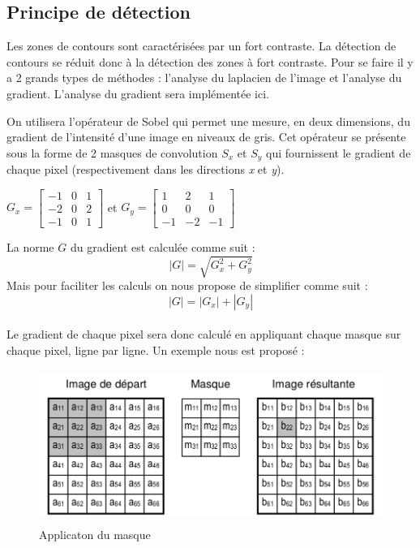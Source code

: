 \subsection{Principe de détection}
Les zones de contours sont caractérisées par un fort contraste. La détection de contours se réduit donc à la détection des zones à fort contraste. Pour se faire il y a 2 grands types de méthodes : l'analyse du laplacien de l'image et l'analyse du gradient. L'analyse du gradient sera implémentée ici.

\medskip

On utilisera l'opérateur de Sobel qui permet une mesure, en deux dimensions, du gradient de l'intensité d'une image en niveaux de gris. Cet opérateur se présente sous la forme de 2 masques de convolution $S_x$ et $S_y$ qui fournissent le gradient de chaque pixel (respectivement dans les directions \textit{x} et \textit{y}).\\
\begin{center}
$ G_x=
 \begin{bmatrix}
    -1 & 0 & 1 \\
    -2 & 0 & 2 \\
    -1 & 0 & 1
 \end{bmatrix}$
 et 
$G_y=
 \begin{bmatrix}
    1 & 2 & 1 \\
    0 & 0 & 0 \\
    -1 & -2 & -1
 \end{bmatrix}$
\end{center} 
La norme $G$ du gradient est calculée comme suit :
\begin{equation}
|G| = \sqrt{G_x^2 + G_y^2}    
\end{equation}
Mais pour faciliter les calculs on nous propose de simplifier comme suit :
\begin{equation}
|G| = |G_x| + |G_y|    
\end{equation}
\\
Le gradient de chaque pixel sera donc calculé en appliquant chaque masque sur chaque pixel, ligne par ligne. Un exemple nous est proposé :
\begin{figure}[!h]
   \centering\includegraphics[height=5cm]{img/exemple_masque.png}
   \caption{Applicaton du masque}
\end{figure}
